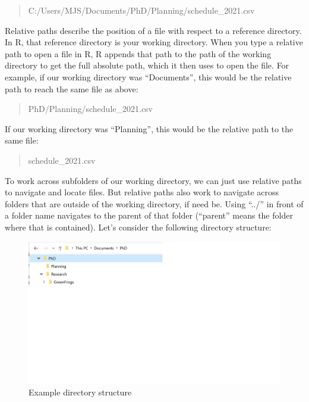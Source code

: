 \documentclass[
]{book}
\begin{document}
\begin{quote}
C:/Users/MJS/Documents/PhD/Planning/schedule\_2021.csv
\end{quote}

Relative paths describe the position of a file with respect to a reference directory. In R, that reference directory is your working directory. When you type a relative path to open a file in R, R appends that path to the path of the working directory to get the full absolute path, which it then uses to open the file. For example, if our working directory was ``Documents'', this would be the relative path to reach the same file as above:

\begin{quote}
PhD/Planning/schedule\_2021.csv
\end{quote}

If our working directory was ``Planning'', this would be the relative path to the same file:

\begin{quote}
schedule\_2021.csv
\end{quote}

To work across subfolders of our working directory, we can just use relative paths to navigate and locate files. But relative paths also work to navigate across folders that are outside of the working directory, if need be. Using ``../'' in front of a folder name navigates to the parent of that folder (``parent'' means the folder where that is contained). Let's consider the following directory structure:

\begin{figure}

{\centering \includegraphics[width=32in]{img/directory-tree} 

}

\caption{Example directory structure}\label{fig:dir-example}
\end{figure}
\end{document}
